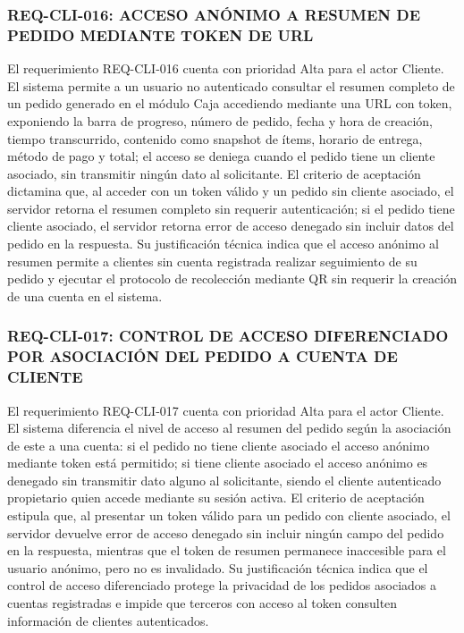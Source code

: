 \subsubsection{REQ-CLI-016: ACCESO ANÓNIMO A RESUMEN DE PEDIDO MEDIANTE TOKEN DE URL}
El requerimiento REQ-CLI-016 cuenta con prioridad Alta para el actor Cliente. El sistema permite a un usuario no autenticado consultar el resumen completo de un pedido generado en el módulo Caja accediendo mediante una URL con token, exponiendo la barra de progreso, número de pedido, fecha y hora de creación, tiempo transcurrido, contenido como snapshot de ítems, horario de entrega, método de pago y total; el acceso se deniega cuando el pedido tiene un cliente asociado, sin transmitir ningún dato al solicitante. El criterio de aceptación dictamina que, al acceder con un token válido y un pedido sin cliente asociado, el servidor retorna el resumen completo sin requerir autenticación; si el pedido tiene cliente asociado, el servidor retorna error de acceso denegado sin incluir datos del pedido en la respuesta. Su justificación técnica indica que el acceso anónimo al resumen permite a clientes sin cuenta registrada realizar seguimiento de su pedido y ejecutar el protocolo de recolección mediante QR sin requerir la creación de una cuenta en el sistema.

\subsubsection{REQ-CLI-017: CONTROL DE ACCESO DIFERENCIADO POR ASOCIACIÓN DEL PEDIDO A CUENTA DE CLIENTE}
El requerimiento REQ-CLI-017 cuenta con prioridad Alta para el actor Cliente. El sistema diferencia el nivel de acceso al resumen del pedido según la asociación de este a una cuenta: si el pedido no tiene cliente asociado el acceso anónimo mediante token está permitido; si tiene cliente asociado el acceso anónimo es denegado sin transmitir dato alguno al solicitante, siendo el cliente autenticado propietario quien accede mediante su sesión activa. El criterio de aceptación estipula que, al presentar un token válido para un pedido con cliente asociado, el servidor devuelve error de acceso denegado sin incluir ningún campo del pedido en la respuesta, mientras que el token de resumen permanece inaccesible para el usuario anónimo, pero no es invalidado. Su justificación técnica indica que el control de acceso diferenciado protege la privacidad de los pedidos asociados a cuentas registradas e impide que terceros con acceso al token consulten información de clientes autenticados.

